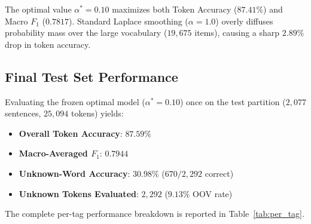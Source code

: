 \documentclass[conference]{IEEEtran}
\begin{document}
The optimal value $\alpha^* = 0.10$ maximizes both Token Accuracy ($87.41\%$) and Macro $F_1$ ($0.7817$). Standard Laplace smoothing ($\alpha = 1.0$) overly diffuses probability mass over the large vocabulary ($19,675$ items), causing a sharp $2.89\%$ drop in token accuracy.

\subsection{Final Test Set Performance}
Evaluating the frozen optimal model ($\alpha^* = 0.10$) once on the test partition ($2,077$ sentences, $25,094$ tokens) yields:
\begin{itemize}
    \item \textbf{Overall Token Accuracy}: $\mathbf{87.59\%}$
    \item \textbf{Macro-Averaged $F_1$}: $\mathbf{0.7944}$
    \item \textbf{Unknown-Word Accuracy}: $\mathbf{30.98\%}$ ($670 / 2,292$ correct)
    \item \textbf{Unknown Tokens Evaluated}: $2,292$ ($9.13\%$ OOV rate)
\end{itemize}

The complete per-tag performance breakdown is reported in Table~\ref{tab:per_tag}.
\end{document}
